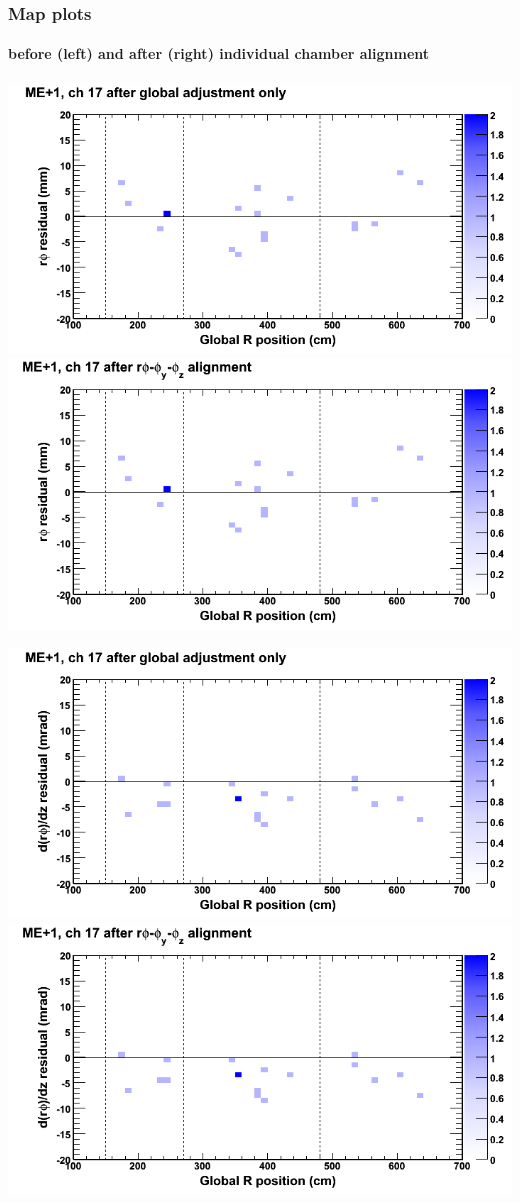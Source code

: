 \documentclass[compress]{beamer}
\begin{document}
\begin{frame}
\frametitle{Map plots}
\framesubtitle{before (left) and after (right) individual chamber alignment}
\includegraphics[width=0.5\linewidth]{ringmapplots_3dof/before_CSCvsr_mep1ch17_x.png} \includegraphics[width=0.5\linewidth]{ringmapplots_3dof/after_CSCvsr_mep1ch17_x.png}

\includegraphics[width=0.5\linewidth]{ringmapplots_3dof/before_CSCvsr_mep1ch17_dxdz.png} \includegraphics[width=0.5\linewidth]{ringmapplots_3dof/after_CSCvsr_mep1ch17_dxdz.png}
\end{frame}
\end{document}
